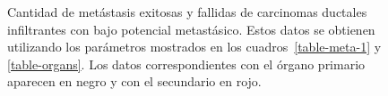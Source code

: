 \begin{figure}[p]
\begin{center}
{}\vspace*{-0.2cm}
\vspace*{-0.2cm}
\end{center}\vspace*{-0.6cm}
\caption[Cantidad de met\'astasis exitosas y fallidas de carcinomas ductales infiltrantes con bajo potencial metast\'asico]{Cantidad de met\'astasis exitosas y fallidas de carcinomas ductales infiltrantes con bajo potencial metast\'asico. Estos datos se obtienen utilizando los par\'ametros mostrados en los cuadros~\ref{table-meta-1} y \ref{table-organs}. Los datos correspondientes con el \'organo primario aparecen en negro y con el secundario en rojo.}
\label{graph-meta-1}
\end{figure}

